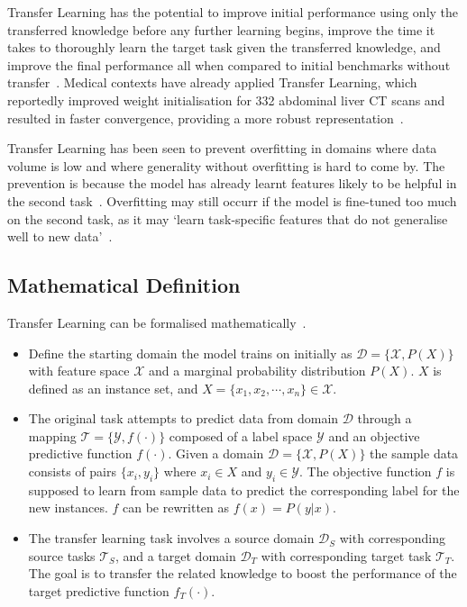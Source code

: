 \documentclass[11pt,twoside]{report}
\begin{document}
Transfer Learning has the potential to improve initial performance using only the transferred knowledge before any further learning begins, improve the time it takes to thoroughly learn the target task given the transferred knowledge, and improve the final performance all when compared to initial benchmarks without transfer~\cite{torrey-handbook}. Medical contexts have already applied Transfer Learning, which reportedly improved weight initialisation for 332 abdominal liver CT scans and resulted in faster convergence, providing a more robust representation~\cite{liver-lesion-via-transfer-learning}.

Transfer Learning has been seen to prevent overfitting in domains where data volume is low and where generality without overfitting is hard to come by. The prevention is because the model has already learnt features likely to be helpful in the second task~\cite{geeks-transfer-learning}. Overfitting may still occurr if the model is fine-tuned too much on the second task, as it may `learn task-specific features that do not generalise well to new data'~\cite{geeks-transfer-learning}.

\subsection{Mathematical Definition}

Transfer Learning can be formalised mathematically~\cite{survey-on-transfer-learning, concise-review-of-transfer-learning}.

\begin{itemize}
  \item Define the starting domain the model trains on initially as $\mathcal{D} = \{\mathcal{X}, P(X)\}$ with feature space $\mathcal{X}$ and a marginal probability distribution $P(X)$. $X$ is defined as an instance set, and $X = \{x_1, x_2, \cdots, x_n\} \in \mathcal{X}$.
  
  \item The original task attempts to predict data from domain $\mathcal{D}$ through a mapping $\mathcal{T} = \{\mathcal{Y}, f(\cdot)\}$ composed of a label space $\mathcal{Y}$ and an objective predictive function $f(\cdot)$. Given a domain $\mathcal{D} = \{\mathcal{X}, P(X)\}$ the sample data consists of pairs $\{x_i, y_i\}$ where $x_i \in X$ and $y_i \in \mathcal{Y}$. The objective function $f$ is supposed to learn from sample data to predict the corresponding label for the new instances. $f$ can be rewritten as $f(x)=P(y|x)$.
  
  \item The transfer learning task involves a source domain $\mathcal{D}_S$ with corresponding source tasks $\mathcal{T}_S$, and a target domain $\mathcal{D}_T$ with corresponding target task $\mathcal{T}_T$. The goal is to transfer the related knowledge to boost the performance of the target predictive function $f_T(\cdot)$.
\end{itemize}
\end{document}
